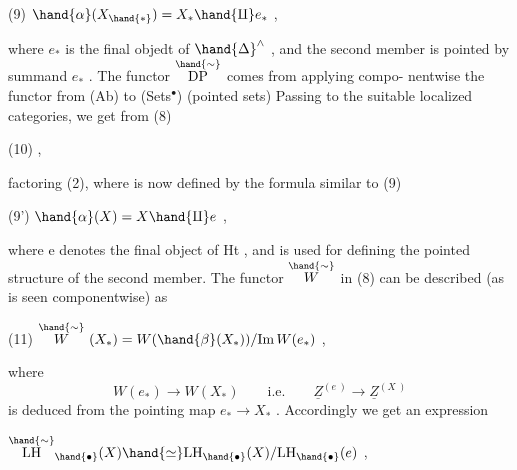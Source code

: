 
(9) \qquad $\hand{\alpha}(X_{\hand{*}}) = X_* \hand{\amalg} e_*$ \qquad ,

where $e_*$ is the  final objedt of $\hand{\Delta}^{\wedge}$ , and the second member is
pointed by  summand $e_*$ . The functor $\overset{\hand{\sim}}{\mathrm{DP}}$ comes from applying compo-%
nentwise the  functor from (Ab) to (Sets$^\bullet$) (pointed sets)  Passing to
the suitable localized categories, we get from (8)

(10)  \qquad ,

factoring (2), where \hand{$\alpha$} is now defined by the formula similar to (9)

(9') \qquad $\hand{\alpha}(X) = X \hand{\amalg} e$ \quad ,

where e denotes the final object of Ht , and is used for defining the
pointed structure of the second member. The functor $\overset{\hand{\sim}}{W}$ in (8) can be
described (as is seen componentwise) as

(11) \qquad $\overset{\hand{\sim}}{W}\ (X_*) = W(\hand{\beta}(X_*))/ \mathrm{Im}\, W(e_*)$ \quad ,

where
\[ W(e_*) \longrightarrow W(X_*) \qquad \text{i.e.} \qquad \underline{Z}^{(e\ )} \longrightarrow \underline{Z}^{(X\ )} \]
is deduced from the pointing map $e_* \longrightarrow X_*$ . Accordingly we get
an expression

 \qquad $\overset{\hand{\sim}}{\mathrm{LH}}_{\hand{\bullet}}(X) \hand{\simeq} \mathrm{LH}_{\hand{\bullet}}(X)/\mathrm{LH}_{\hand{\bullet}}(e)$ \qquad ,

